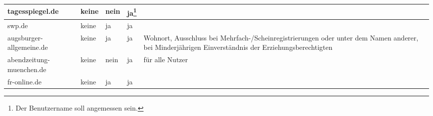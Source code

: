 \begin{longtable}{p{24mm}p{20mm}p{10mm}p{10mm}p{60mm}}
tagesspiegel.de %
& keine
& \centerline{nein}
& \centerline{ja\footnote{Der Benutzername soll angemessen sein.}}
&
\\*\midrule

swp.de %
& keine
& \centerline{ja}
& \centerline{ja}
&
\\*\midrule

augsburger-allgemeine.de %
& keine
& \centerline{ja}
& \centerline{ja}
& Wohnort, Ausschluss bei Mehrfach-/Scheinregistrierungen oder unter dem Namen
  anderer, bei Minderjährigen Einverständnis der Erziehungsberechtigten
\\*\midrule

abendzeitung-muenchen.de %
& keine
& \centerline{nein}
& \centerline{ja}
& für alle Nutzer
\\*\midrule

fr-online.de %
& keine
& \centerline{ja}
& \centerline{ja}
& 


\end{longtable}
\endgroup

